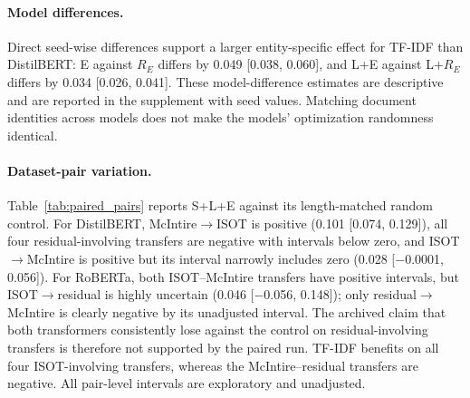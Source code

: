\paragraph{Model differences.}
Direct seed-wise differences support a larger entity-specific effect for TF-IDF than DistilBERT: E against $R_E$ differs by 0.049 [0.038, 0.060], and L+E against L+$R_E$ differs by 0.034 [0.026, 0.041]. These model-difference estimates are descriptive and are reported in the supplement with seed values. Matching document identities across models does not make the models' optimization randomness identical.

\paragraph{Dataset-pair variation.}
Table~\ref{tab:paired_pairs} reports S+L+E against its length-matched random control. For DistilBERT, McIntire$\rightarrow$ISOT is positive (0.101 [0.074, 0.129]), all four residual-involving transfers are negative with intervals below zero, and ISOT$\rightarrow$McIntire is positive but its interval narrowly includes zero (0.028 [$-$0.0001, 0.056]). For RoBERTa, both ISOT--McIntire transfers have positive intervals, but ISOT$\rightarrow$residual is highly uncertain (0.046 [$-$0.056, 0.148]); only residual$\rightarrow$McIntire is clearly negative by its unadjusted interval. The archived claim that both transformers consistently lose against the control on residual-involving transfers is therefore not supported by the paired run. TF-IDF benefits on all four ISOT-involving transfers, whereas the McIntire--residual transfers are negative. All pair-level intervals are exploratory and unadjusted.

\begin{table}[t]
\caption{Document-paired S+L+E minus L+$R_{SE}$ by ordered pair: mean and 95\% interval over eight seeds. Exploratory; no pair-level multiplicity correction. ``Residual'' is the constructed WELFake residual.}\label{tab:paired_pairs}
\centering\scriptsize
{}
\end{table}

